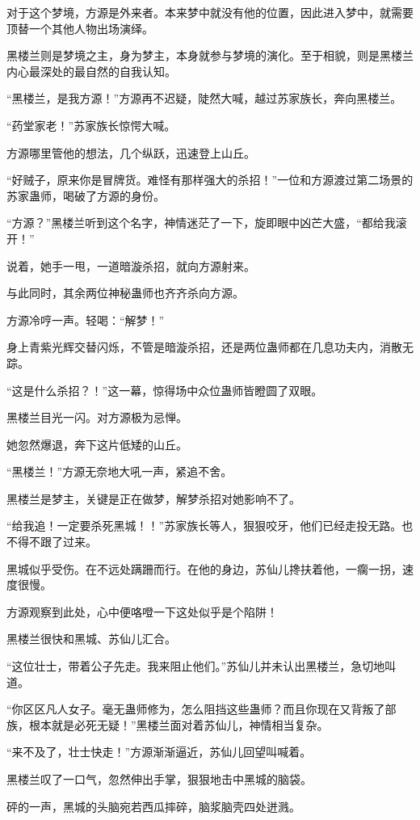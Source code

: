 \begin{this_body}
对于这个梦境，方源是外来者。本来梦中就没有他的位置，因此进入梦中，就需要顶替一个其他人物出场演绎。

黑楼兰则是梦境之主，身为梦主，本身就参与梦境的演化。至于相貌，则是黑楼兰内心最深处的最自然的自我认知。

“黑楼兰，是我方源！”方源再不迟疑，陡然大喊，越过苏家族长，奔向黑楼兰。

“药堂家老！”苏家族长惊愕大喊。

方源哪里管他的想法，几个纵跃，迅速登上山丘。

“好贼子，原来你是冒牌货。难怪有那样强大的杀招！”一位和方源渡过第二场景的苏家蛊师，喝破了方源的身份。

“方源？”黑楼兰听到这个名字，神情迷茫了一下，旋即眼中凶芒大盛，“都给我滚开！”

说着，她手一甩，一道暗漩杀招，就向方源射来。

与此同时，其余两位神秘蛊师也齐齐杀向方源。

方源冷哼一声。轻喝：“解梦！”

身上青紫光辉交替闪烁，不管是暗漩杀招，还是两位蛊师都在几息功夫内，消散无踪。

“这是什么杀招？！”这一幕，惊得场中众位蛊师皆瞪圆了双眼。

黑楼兰目光一闪。对方源极为忌惮。

她忽然爆退，奔下这片低矮的山丘。

“黑楼兰！”方源无奈地大吼一声，紧追不舍。

黑楼兰是梦主，关键是正在做梦，解梦杀招对她影响不了。

“给我追！一定要杀死黑城！！”苏家族长等人，狠狠咬牙，他们已经走投无路。也不得不跟了过来。

黑城似乎受伤。在不远处蹒跚而行。在他的身边，苏仙儿搀扶着他，一瘸一拐，速度很慢。

方源观察到此处，心中便咯噔一下这处似乎是个陷阱！

黑楼兰很快和黑城、苏仙儿汇合。

“这位壮士，带着公子先走。我来阻止他们。”苏仙儿并未认出黑楼兰，急切地叫道。

“你区区凡人女子。毫无蛊师修为，怎么阻挡这些蛊师？而且你现在又背叛了部族，根本就是必死无疑！”黑楼兰面对着苏仙儿，神情相当复杂。

“来不及了，壮士快走！”方源渐渐逼近，苏仙儿回望叫喊着。

黑楼兰叹了一口气，忽然伸出手掌，狠狠地击中黑城的脑袋。

砰的一声，黑城的头脑宛若西瓜摔碎，脑浆脑壳四处迸溅。


\end{this_body}
